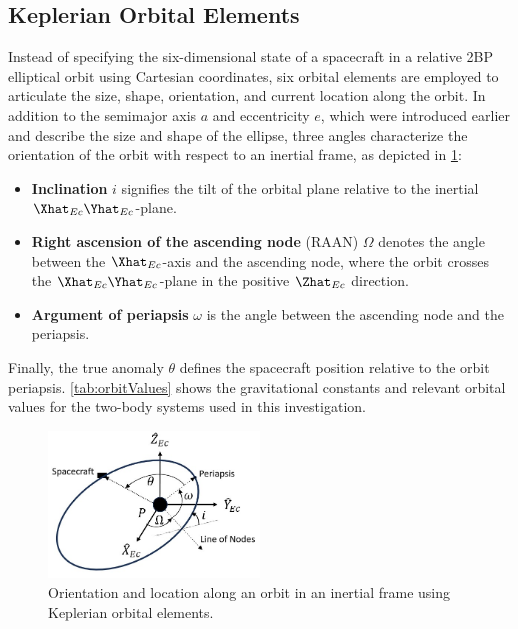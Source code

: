 \subsection{Keplerian Orbital Elements}
Instead of specifying the six-dimensional state of a spacecraft in a relative 2BP elliptical orbit
using Cartesian coordinates, six orbital elements are employed to articulate the size, shape,
orientation, and current location along the orbit. In addition to the semimajor axis $a$ and
eccentricity $e$, which were introduced earlier and describe the size and shape of the ellipse,
three angles characterize the orientation of the orbit with respect to an inertial frame, as
depicted in \cref{fig:orbitalElements}:
\begin{itemize}
    \item \textbf{Inclination} $i$ signifies the tilt of the orbital plane relative to the inertial
    $\Xhat_{Ec}\Yhat_{Ec}$-plane.
    \item \textbf{Right ascension of the ascending node} (RAAN) $\Omega$ denotes the angle between
    the $\Xhat_{Ec}$-axis and the ascending node, where the orbit crosses the
    $\Xhat_{Ec}\Yhat_{Ec}$-plane in the positive $\Zhat_{Ec}$ direction.
    \item \textbf{Argument of periapsis} $\omega$ is the angle between the ascending node and the
    periapsis.
\end{itemize}
Finally, the true anomaly $\theta$ defines the spacecraft position relative to the orbit periapsis.
\cref{tab:orbitValues} shows the gravitational constants and relevant orbital values for the
two-body systems used in this investigation.

\begin{figure}[H]
    \centering
    \includegraphics[width=0.5\textwidth]{figures/OrbitalElements.jpg}
    \caption{Orientation and location along an orbit in an inertial frame using Keplerian orbital elements.}
    \label{fig:orbitalElements}
\end{figure}


